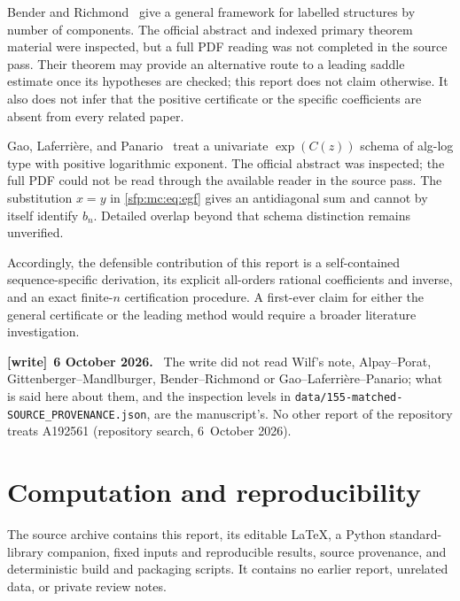 \documentclass[11pt,letterpaper]{article}
\numberwithin{equation}{section}
\theoremstyle{definition}\newtheorem{definition}[theorem]{Definition}
\theoremstyle{remark}\newtheorem{remark}[theorem]{Remark}
\newcommand{\file}[1]{\nolinkurl{#1}}
\newenvironment{writenote}[1][]{\par\smallskip\begingroup\small
 \noindent\textbf{[write]}\if\relax\detokenize{#1}\relax\else~\textbf{#1.}\fi\ }%
 {\par\endgroup\smallskip}
\begin{document}
Bender and Richmond~\cite{bender} give a general framework for
labelled structures by number of components. The official abstract
and indexed primary theorem material were inspected, but a full
PDF reading was not completed in the source pass. Their theorem
may provide an alternative route to a leading saddle estimate
once its hypotheses are checked; this report does not claim
otherwise. It also does not infer that the positive certificate
or the specific coefficients are absent from every related paper.

Gao, Laferri\`ere, and Panario~\cite{gao} treat a univariate
$\exp(C(z))$ schema of alg-log type with positive logarithmic
exponent. The official abstract was inspected; the full PDF could
not be read through the available reader in the source pass.
The substitution $x=y$ in \eqref{sfp:mc:eq:egf} gives an antidiagonal
sum and cannot by itself identify $b_n$. Detailed overlap beyond
that schema distinction remains unverified.

Accordingly, the defensible contribution of this report is a
self-contained sequence-specific derivation, its explicit
all-orders rational coefficients and inverse, and an exact
finite-$n$ certification procedure. A first-ever claim for either
the general certificate or the leading method would require a
broader literature investigation.
\begin{writenote}[6 October 2026]
The write did not read Wilf's note, Alpay--Porat, Gittenberger--Mandlburger, Bender--Richmond or Gao--Laferri\`ere--Panario; what is said here about them, and the inspection levels in \file{data/155-matched-SOURCE_PROVENANCE.json}, are the manuscript's. No other report of the repository treats A192561 (repository search, 6~October 2026).
\end{writenote}

\section{Computation and reproducibility}\label{sfp:mc:sec:computation}

The source archive contains this report, its editable LaTeX,
a Python standard-library companion, fixed inputs and reproducible
results, source provenance, and deterministic build and packaging
scripts. It contains no earlier report, unrelated data, or
private review notes.
\end{document}
